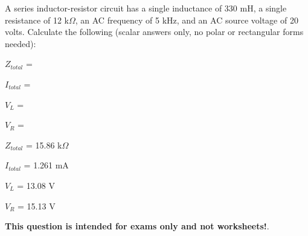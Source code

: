 

A series inductor-resistor circuit has a single inductance of 330 mH, a single resistance of 12 k$\Omega$, an AC frequency of 5 kHz, and an AC source voltage of 20 volts.  Calculate the following (scalar answers only, no polar or rectangular forms needed):

\vskip 10pt

$Z_{total}$ =

\vskip 10pt

$I_{total}$ = 

\vskip 10pt

$V_{L}$ = 

\vskip 10pt

$V_{R}$ = 







$Z_{total}$ = 15.86 k$\Omega$

\vskip 10pt

$I_{total}$ = 1.261 mA

\vskip 10pt

$V_{L}$ = 13.08 V

\vskip 10pt

$V_{R}$ = 15.13 V








{\bf This question is intended for exams only and not worksheets!}.



